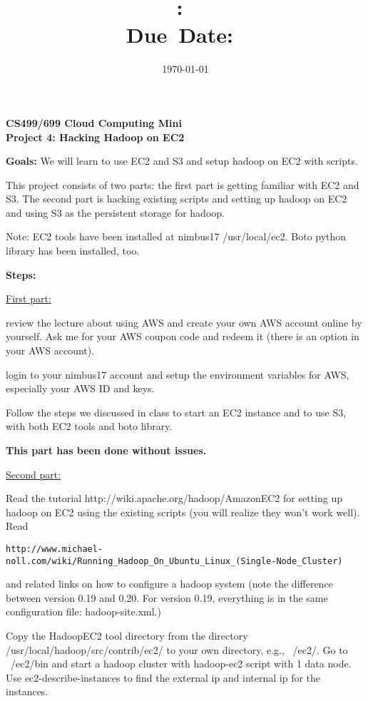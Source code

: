 \documentclass{article}
\title{\textbf{\hmwkClass:\ 
      \hmwkTitle}\\\normalsize\small{Due\ Date:\
    \hmwkDueDate}}
\date{\today}
\author{\textbf{\hmwkAuthorName}}
\begin{document}
\begin{center}
\textbf{CS499/699 Cloud Computing Mini \\
Project 4: Hacking Hadoop on EC2}
\end{center}

\textbf{Goals:} We will learn to use EC2 and S3 and setup hadoop on EC2 with
scripts. 
 
This project consists of two parts: the first part is getting familiar
with EC2 and S3. The second part is hacking existing scripts and
setting up hadoop on EC2 and using S3 as the persistent storage for
hadoop.
 
Note: EC2 tools have been installed at nimbus17 /usr/local/ec2. Boto
python library has been installed, too.
 
\textbf{Steps:}

\underline{First part:}
 
review the lecture about using AWS and create your own AWS account
online by yourself. Ask me for your AWS coupon code and redeem it
(there is an option in your AWS account).
 
login to your nimbus17 account and setup the environment variables for
AWS, especially your AWS ID and keys.
 
Follow the steps we discussed in class to start an EC2 instance and to
use S3, with both EC2 tools and boto library.

\textbf{This part has been done without issues. }

\underline{Second part:}
 
Read the tutorial http://wiki.apache.org/hadoop/AmazonEC2 for setting
up hadoop on EC2 using the existing scripts (you will realize they
won’t work well). Read 
\begin{verbatim}
http://www.michael-noll.com/wiki/Running_Hadoop_On_Ubuntu_Linux_(Single-Node_Cluster)  
\end{verbatim}
and related links on how to configure a hadoop system (note the
difference between version 0.19 and 0.20. For version 0.19, everything
is in the same configuration file: hadoop-site.xml.)
 
Copy the HadoopEC2 tool directory from the directory
/usr/local/hadoop/src/contrib/ec2/ to your own directory, e.g.,
~/ec2/. Go to ~/ec2/bin and start a hadoop cluster with hadoop-ec2
script with 1 data node. Use ec2-describe-instances to find the
external ip and internal ip for the instances.
\end{document}
